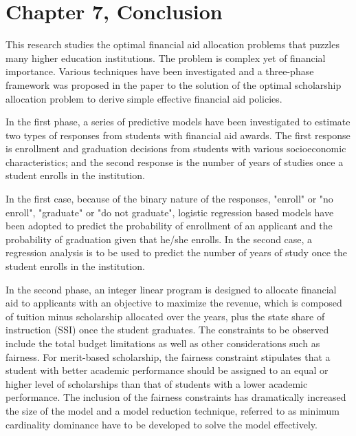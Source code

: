 \documentclass[12pt,english]{report}
\begin{document}

\chapter{Chapter 7, Conclusion}
This research studies the optimal financial aid allocation problems that puzzles many higher education institutions.  The problem is complex yet of financial importance. Various techniques have been investigated and a three-phase framework was proposed in the paper to the solution of the optimal scholarship allocation problem to derive simple effective financial aid policies.

In the first phase, a series of predictive models have been investigated to estimate two types of responses from students with financial aid awards. The first response is enrollment and graduation decisions from students with various socioeconomic characteristics;  and the second response is the number of years of studies once a student enrolls in the institution.

In the first case,  because of the binary nature of the responses,  "enroll" or "no enroll",  "graduate" or "do not graduate", logistic regression based models have been adopted to predict the probability of enrollment of an applicant and the probability of graduation given that he/she enrolls. In the second case, a regression analysis is to be used to predict the number of years of study once the student enrolls in the institution.

In the second phase, an integer linear program is designed to allocate financial aid to applicants with an objective to maximize the revenue, which is composed of tuition minus scholarship allocated over the years, plus the state share of instruction (SSI) once the student graduates.  The constraints to be observed include the total budget limitations as well as other considerations such as fairness. For merit-based scholarship, the fairness constraint stipulates that a student with better academic performance should be assigned to an equal or higher level of scholarships than that of students with a lower academic performance. The inclusion of the fairness constraints has dramatically increased the size of the model and a model reduction technique, referred to as minimum cardinality dominance have to be developed to solve the model effectively.
\end{document}
